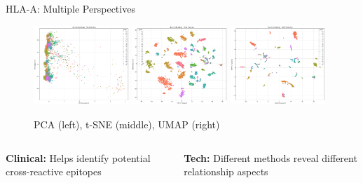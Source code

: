 \documentclass[aspectratio=169]{beamer}
\newcommand{\forclinical}[1]{\textcolor{clinicalcolor}{\textbf{Clinical:} #1}}
\newcommand{\forbioinformatics}[1]{\textcolor{bioinfocolor}{\textbf{Tech:} #1}}
\begin{document}
\begin{frame}{HLA-A: Multiple Perspectives}
  \begin{figure}
    \centering
    \includegraphics[width=0.32\textwidth]{data/analysis/locus_embeddings/class1/plots/hla_A_pca.png}
    \includegraphics[width=0.32\textwidth]{data/analysis/locus_embeddings/class1/plots/hla_A_tsne.png}
    \includegraphics[width=0.32\textwidth]{data/analysis/locus_embeddings/class1/plots/hla_A_umap.png}
    \caption{\small PCA (left), t-SNE (middle), UMAP (right)}
  \end{figure}
  
  \begin{columns}
    \begin{column}{0.5\textwidth}
      \begin{tcolorbox}[colback=gray!5,colframe=gray!40]\small
      \forclinical{Helps identify potential cross-reactive epitopes}
      \end{tcolorbox}
    \end{column}
    \begin{column}{0.5\textwidth}
      \begin{tcolorbox}[colback=gray!5,colframe=gray!40]\small
      \forbioinformatics{Different methods reveal different relationship aspects}
      \end{tcolorbox}
    \end{column}
  \end{columns}
\end{frame}
\end{document}
